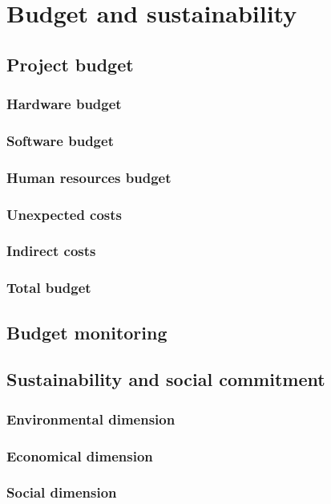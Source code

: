 \section{Budget and sustainability}



\subsection{Project budget}

\subsubsection{Hardware budget}

\subsubsection{Software budget}

\subsubsection{Human resources budget}

\subsubsection{Unexpected costs}

\subsubsection{Indirect costs}

\subsubsection{Total budget}

\subsection{Budget monitoring}

\subsection{Sustainability and social commitment}

\subsubsection{Environmental dimension}

\subsubsection{Economical dimension}

\subsubsection{Social dimension}


